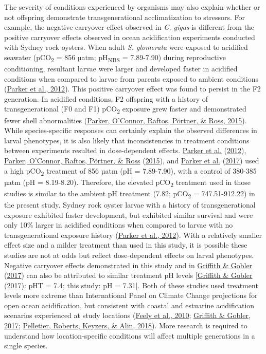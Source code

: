 \documentclass [11pt, proquest] {uwthesis}[2015/03/03]
\begin{document}
The severity of conditions experienced by organisms may also explain whether or not offspring demonstrate transgenerational acclimatization to stressors. For example, the negative carryover effect observed in \emph{C. gigas} is different from the positive carryover effects observed in ocean acidification experiments conducted with Sydney rock oysters. When adult \emph{S. glomerata} were exposed to acidified seawater (pCO\textsubscript{2} = 856 µatm; pH\textsubscript{NBS} = 7.89-7.90) during reproductive conditioning, resultant larvae were larger and developed faster in acidified conditions when compared to larvae from parents exposed to ambient conditions (\protect\hyperlink{ref-Parker2012}{Parker et al., 2012}). This positive carryover effect was found to persist in the F2 generation. In acidified conditions, F2 offspring with a history of transgenerational (F0 and F1) pCO\textsubscript{2} exposure grew faster and demonstrated fewer shell abnormalities (\protect\hyperlink{ref-Parker2015}{Parker, O'Connor, Raftos, Pörtner, \& Ross, 2015}). While species-specific responses can certainly explain the observed differences in larval phenotypes, it is also likely that inconsistencies in treatment conditions between experiments resulted in dose-dependent effects. \protect\hyperlink{ref-Parker2012}{Parker et al.} (\protect\hyperlink{ref-Parker2012}{2012}), \protect\hyperlink{ref-Parker2015}{Parker, O'Connor, Raftos, Pörtner, \& Ross} (\protect\hyperlink{ref-Parker2015}{2015}), and \protect\hyperlink{ref-Parker2017}{Parker et al.} (\protect\hyperlink{ref-Parker2017}{2017}) used a high pCO\textsubscript{2} treatment of 856 µatm (pH = 7.89-7.90), with a control of 380-385 µatm (pH = 8.19-8.20). Therefore, the elevated pCO\textsubscript{2} treatment used in those studies is similar to the ambient pH treatment (7.82; pCO\textsubscript{2} = 747.51-912.22) in the present study. Sydney rock oyster larvae with a history of transgenerational exposure exhibited faster development, but exhibited similar survival and were only 10\% larger in acidified conditions when compared to larvae with no transgenerational exposure history (\protect\hyperlink{ref-Parker2012}{Parker et al., 2012}). With a relatively smaller effect size and a milder treatment than used in this study, it is possible these studies are not at odds but reflect dose-dependent effects on larval phenotypes. Negative carryover effects demonstrated in this study and in \protect\hyperlink{ref-Griffith2017}{Griffith \& Gobler} (\protect\hyperlink{ref-Griffith2017}{2017}) can also be attributed to similar treatment pH levels {[}\protect\hyperlink{ref-Griffith2017}{Griffith \& Gobler} (\protect\hyperlink{ref-Griffith2017}{2017}): pHT = 7.4; this study: pH = 7.31{]}. Both of these studies used treatment levels more extreme than International Panel on Climate Change projections for open ocean acidification, but consistent with coastal and estuarine acidification scenarios experienced at study locations (\protect\hyperlink{ref-Feely2010}{Feely et al., 2010}; \protect\hyperlink{ref-Griffith2017}{Griffith \& Gobler, 2017}; \protect\hyperlink{ref-Pelletier2018}{Pelletier, Roberts, Keyzers, \& Alin, 2018}). More research is required to understand how location-specific conditions will affect multiple generations in a single species.
\end{document}
